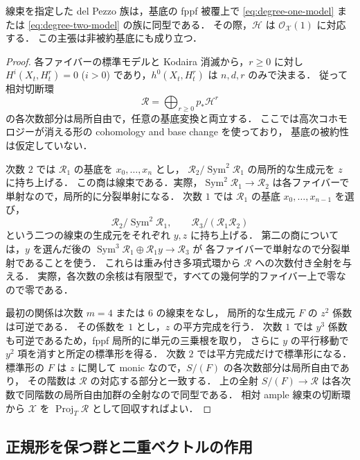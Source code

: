 \begin{lemma}[族の標準形]
\label{lemma:family-normal-form}
線束を指定した del Pezzo 族は，基底の fppf 被覆上で
\eqref{eq:degree-one-model} または \eqref{eq:degree-two-model} の族に同型である．
その際，$\mathcal H$ は $\mathcal O_{\mathcal X}(1)$ に対応する．
この主張は非被約基底にも成り立つ．
\end{lemma}

\begin{proof}
各ファイバーの標準モデルと Kodaira 消滅から，$r\geq0$ に対し
$H^i(X_t,H_t^r)=0$ ($i>0$) であり，$h^0(X_t,H_t^r)$ は $n,d,r$ のみで決まる．
従って相対切断環
\[
 \mathcal R=\bigoplus_{r\geq0}p_*\mathcal H^r
\]
の各次数部分は局所自由で，任意の基底変換と両立する．
ここでは高次コホモロジーが消える形の cohomology and base change を使っており，
基底の被約性は仮定していない．

次数 $2$ では $\mathcal R_1$ の基底を $x_0,\ldots,x_n$ とし，
$\mathcal R_2/\operatorname{Sym}^2\mathcal R_1$ の局所的な生成元を $z$ に持ち上げる．
この商は線束である．実際，$\operatorname{Sym}^2\mathcal R_1\to\mathcal R_2$
は各ファイバーで単射なので，局所的に分裂単射になる．
次数 $1$ では $\mathcal R_1$ の基底 $x_0,\ldots,x_{n-1}$ を選び，
\[
 \mathcal R_2/\operatorname{Sym}^2\mathcal R_1,
 \qquad
 \mathcal R_3/(\mathcal R_1\mathcal R_2)
\]
という二つの線束の生成元をそれぞれ $y,z$ に持ち上げる．
第二の商については，$y$ を選んだ後の
$\operatorname{Sym}^3\mathcal R_1\oplus\mathcal R_1y\to\mathcal R_3$ が
各ファイバーで単射なので分裂単射であることを使う．
これらは重み付き多項式環から $\mathcal R$ への次数付き全射を与える．
実際，各次数の余核は有限型で，すべての幾何学的ファイバー上で零なので零である．

最初の関係は次数 $m=4$ または $6$ の線束をなし，
局所的な生成元 $F$ の $z^2$ 係数は可逆である．
その係数を $1$ とし，$z$ の平方完成を行う．
次数 $1$ では $y^3$ 係数も可逆であるため，fppf 局所的に単元の三乗根を取り，
さらに $y$ の平行移動で $y^2$ 項を消すと所定の標準形を得る．
次数 $2$ では平方完成だけで標準形になる．
標準形の $F$ は $z$ に関して monic なので，$S/(F)$ の各次数部分は局所自由であり，
その階数は $\mathcal R$ の対応する部分と一致する．
上の全射 $S/(F)\to\mathcal R$ は各次数で同階数の局所自由加群の全射なので同型である．
相対 ample 線束の切断環から $\mathcal X$ を $\operatorname{Proj}_T\mathcal R$ として回収すればよい．
\end{proof}

\subsection{正規形を保つ群と二重ベクトルの作用}

